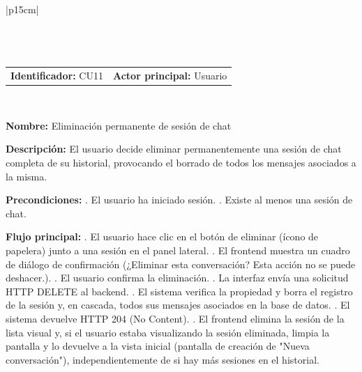 \begingroup
{}
\setlength{\arrayrulewidth}{1pt}
\begin{longtable}{|p{15cm}|}
  \hline
   \\
  \hline
  \endfirsthead
   \\
  \hline
   \\
  \hline
  \endhead
  \hline {} \\ \hline
  \endfoot
  \hline
  \caption{Caso de Uso CU11 — Eliminación permanente de sesión de chat.}
  \label{TB:CU11_ELIMINAR_SESION}
  \endlastfoot

  \begin{tabularx}{\linewidth}{@{}X X@{}}
    \textbf{Identificador:} CU11 & \textbf{Actor principal:} Usuario
  \end{tabularx} \\ \hline

  \textbf{Nombre:} Eliminación permanente de sesión de chat \\ \hline

  \textbf{Descripción:} \newline 
  El usuario decide eliminar permanentemente una sesión de chat completa de su historial, provocando el borrado de todos los mensajes asociados a la misma. \\ \hline

  \textbf{Precondiciones:} . El usuario ha iniciado sesión. . Existe al menos una sesión de chat. \\ \hline

  \textbf{Flujo principal:} . El usuario hace clic en el botón de eliminar (ícono de papelera) junto a una sesión en el panel lateral. . El frontend muestra un cuadro de diálogo de confirmación (¿Eliminar esta conversación? Esta acción no se puede deshacer.). . El usuario confirma la eliminación. . La interfaz envía una solicitud HTTP DELETE al backend. . El sistema verifica la propiedad y borra el registro de la sesión y, en cascada, todos sus mensajes asociados en la base de datos. . El sistema devuelve HTTP 204 (No Content). . El frontend elimina la sesión de la lista visual y, si el usuario estaba visualizando la sesión eliminada, limpia la pantalla y lo devuelve a la vista inicial (pantalla de creación de "Nueva conversación"), independientemente de si hay más sesiones en el historial. \\ \hline


\end{longtable}
